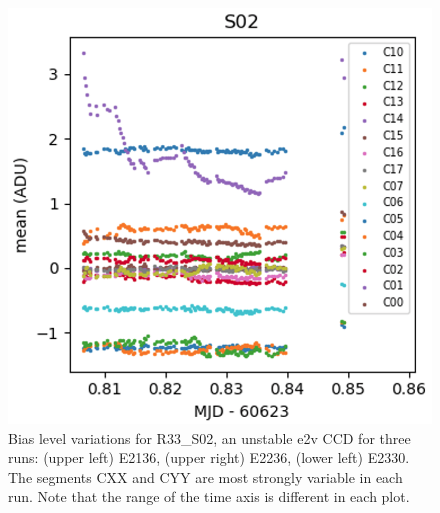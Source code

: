\begin{figure}[htbp]
\vspace{0.05\textwidth}

\begin{minipage}[b]{0.45\textwidth}
    \centering
    \includegraphics[width=\textwidth]{figures/E2330_R33_S02.png}
\end{minipage}
\hspace{0.05\textwidth}
\hfill
\begin{minipage}[b]{0.45\textwidth}
    \centering
\end{minipage}
\caption{Bias level variations for R33\_S02, an unstable e2v CCD for three runs:  (upper left) E2136, (upper right) E2236, (lower left) E2330.  The segments CXX and CYY are most strongly variable in each run.  Note that the range of the time axis is different in each plot.}
\label{fig:r33_s02_bias}
\end{figure}


%
%

